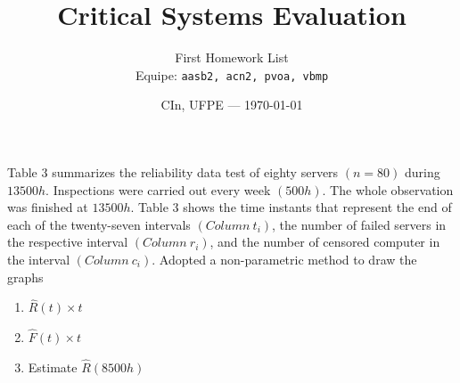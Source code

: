 \documentclass{article}
\title{Critical Systems Evaluation} %
\author{First Homework List\\ Equipe: \texttt{aasb2, acn2, pvoa, vbmp}} %
\date{CIn, UFPE --- \today} %
\begin{document}
\maketitle %

\setcounter{Question}{4}
\begin{question}
    Table 3 summarizes the reliability data test of eighty servers $(n = 80)$ during $13500h$. Inspections were carried out every week $(500h)$. The whole observation was finished at $13500h$. Table 3 shows the time instants that represent the end of each of the twenty-seven intervals $(Column \ t_i)$, the number of failed servers in the respective interval $(Column \ r_i)$, and the number of censored computer in the interval $(Column \ c_i)$. Adopted a non-parametric method to draw the graphs
    \begin{enumerate}[label=(\alph*)]
        \item $\hat{R}(t) \times t$
        \item $\hat{F}(t) \times t$
        \item Estimate $\hat{R}(8500h)$
    \end{enumerate}
\end{question}
\end{document}
